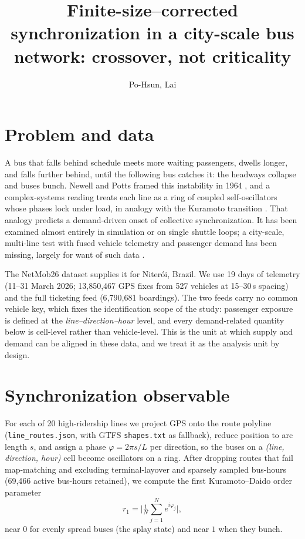 \documentclass[9pt,twocolumn,twoside]{opticajnl}
\title{Finite-size--corrected synchronization in a city-scale bus network:
crossover, not criticality}
\author[1,*]{Po-Hsun, Lai}
\affil[1]{Physics, National Taiwan University, Taipei, Taiwan}
\affil[*]{b11202025@ntu.edu.tw}
\begin{document}
\maketitle

\section{Problem and data}
A bus that falls behind schedule meets more waiting passengers, dwells longer, and falls
further behind, until the following bus catches it: the headways collapse and buses bunch.
Newell and Potts framed this instability in 1964 \cite{newell64}, and a complex-systems
reading treats each line as a ring of coupled self-oscillators whose phases lock under load,
in analogy with the Kuramoto transition \cite{saw19,strogatz00}. That analogy predicts a
demand-driven onset of collective synchronization. It has been examined almost entirely in
simulation or on single shuttle loops; a city-scale, multi-line test with fused vehicle
telemetry and passenger demand has been missing, largely for want of such data
\cite{schlapfer21}.

The NetMob26 dataset \cite{netmob26} supplies it for Niter\'oi, Brazil. We use 19 days of
telemetry (11--31 March 2026; 13{,}850{,}467 GPS fixes from 527 vehicles at 15--30\,s
spacing) and the full ticketing feed (6{,}790{,}681 boardings). The two feeds carry no common
vehicle key, which fixes the identification scope of the study: passenger exposure is defined
at the \textit{line--direction--hour} level, and every demand-related quantity below is
cell-level rather than vehicle-level. This is the unit at which supply and demand can be
aligned in these data, and we treat it as the analysis unit by design.

\section{Synchronization observable}
For each of 20 high-ridership lines we project GPS onto the route polyline
(\texttt{line\_routes.json}, with GTFS \texttt{shapes.txt} as fallback), reduce position to
arc length $s$, and assign a phase $\varphi = 2\pi s / L$ per direction, so the buses on a
\textit{(line, direction, hour)} cell become oscillators on a ring. After dropping routes that
fail map-matching and excluding terminal-layover and sparsely sampled bus-hours
(69{,}466 active bus-hours retained), we compute the first Kuramoto--Daido order parameter
\begin{equation}
r_1 = \Big| \tfrac{1}{N}\sum_{j=1}^{N} e^{i\varphi_j} \Big|,
\label{eq:r1}
\end{equation}
near $0$ for evenly spread buses (the splay state) and near $1$ when they bunch.
\end{document}
